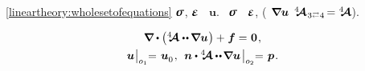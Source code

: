 

\label{section:equationsindisplacements.linearelasticity}
 
~\eqref{lineartheory:wholesetofequations}
$\linearstress$, $\infinitesimaldeformation$ ~$\bm{u}$.
~$\linearstress$
~$\infinitesimaldeformation$,
(~${\hspace{-0.2ex} \bm{\nabla}\hspace{-0.2ex} \bm{u}}$
 ${%
\stiffnesstensor_{\hspace{.12ex} \indexjuggling{3}{4}} \hspace{-0.25ex} = \stiffnesstensor%
}$).

\nopagebreak\vspace{-0.1em}
\begin{equation}\label{lineartheory:equationsindisplacements}
\begin{array}{c}
\boldnabla \dotp \left( \stiffnesstensor \dotdotp \hspace{-0.12ex} \boldnabla \bm{u} \hspace{.1ex} \right) + \hspace{.1ex} \bm{f} = \hspace{.1ex} \zerovector
\hspace{.16ex} , \\[.4em]
%
\bm{u} \hspace{.1ex} \bigr|_{o_1} \hspace{-0.64ex} = \hspace{.2ex} \bm{u}_{\raisemath{-0.1em}{0}}
\hspace{.16ex} , \:\:
\unitnormalvector \dotp %
\stiffnesstensor \hspace{-0.08ex} \dotdotp \hspace{-0.24ex} \boldnabla \bm{u}
\hspace{.25ex} \bigr|_{o_2} \hspace{-0.64ex} = \hspace{.2ex} \bm{p}
\hspace{.16ex} .
\end{array}
\end{equation}%

